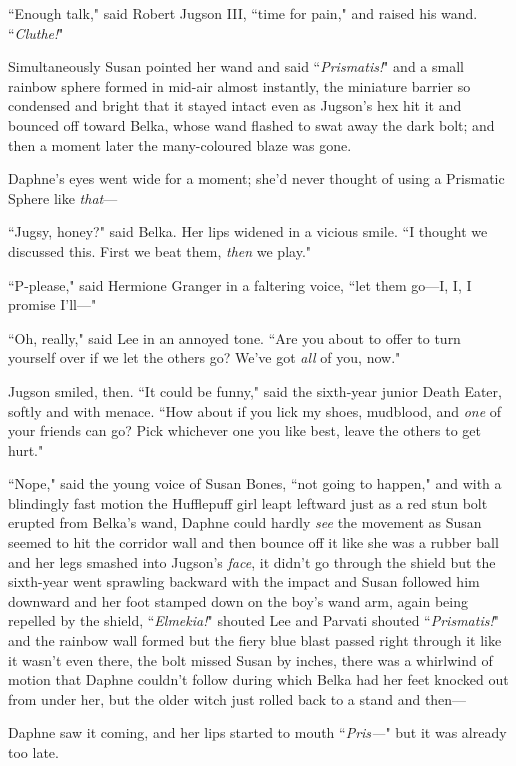 ``Enough talk," said Robert Jugson III, ``time for pain," and raised his wand. ``\emph{Cluthe!}"

Simultaneously Susan pointed her wand and said ``\emph{Prismatis!}" and a small rainbow sphere formed in mid-air almost instantly, the miniature barrier so condensed and bright that it stayed intact even as Jugson's hex hit it and bounced off toward Belka, whose wand flashed to swat away the dark bolt; and then a moment later the many-coloured blaze was gone.

Daphne's eyes went wide for a moment; she'd never thought of using a Prismatic Sphere like \emph{that}—

``Jugsy, honey?" said Belka. Her lips widened in a vicious smile. ``I thought we discussed this. First we beat them, \emph{then} we play."

``P-please," said Hermione Granger in a faltering voice, ``let them go—I, I, I promise I'll—"

``Oh, really," said Lee in an annoyed tone. ``Are you about to offer to turn yourself over if we let the others go? We've got \emph{all} of you, now."

Jugson smiled, then. ``It could be funny," said the sixth-year junior Death Eater, softly and with menace. ``How about if you lick my shoes, mudblood, and \emph{one} of your friends can go? Pick whichever one you like best, leave the others to get hurt."

``Nope," said the young voice of Susan Bones, ``not going to happen," and with a blindingly fast motion the Hufflepuff girl leapt leftward just as a red stun bolt erupted from Belka's wand, Daphne could hardly \emph{see} the movement as Susan seemed to hit the corridor wall and then bounce off it like she was a rubber ball and her legs smashed into Jugson's \emph{face}, it didn't go through the shield but the sixth-year went sprawling backward with the impact and Susan followed him downward and her foot stamped down on the boy's wand arm, again being repelled by the shield, ``\emph{Elmekia!}" shouted Lee and Parvati shouted ``\emph{Prismatis!}" and the rainbow wall formed but the fiery blue blast passed right through it like it wasn't even there, the bolt missed Susan by inches, there was a whirlwind of motion that Daphne couldn't follow during which Belka had her feet knocked out from under her, but the older witch just rolled back to a stand and then—

Daphne saw it coming, and her lips started to mouth ``\emph{Pris—}" but it was already too late.

